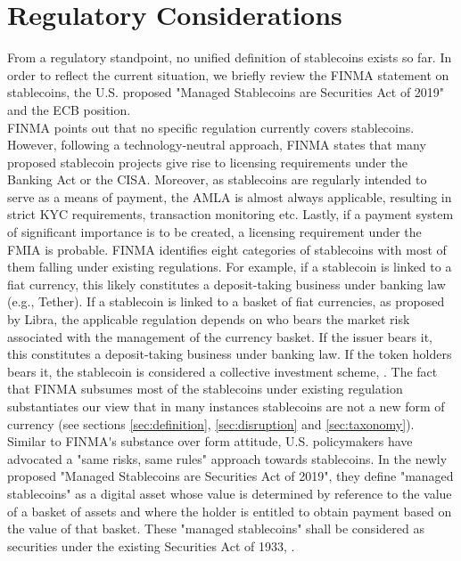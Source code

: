 \documentclass[conference]{IEEEtran}
\begin{document}
\section{Regulatory Considerations}
\label{sec:regulation}
From a regulatory standpoint, no unified definition of stablecoins exists so far. In order to reflect the current situation, we briefly review the \ac{FINMA} statement on stablecoins, the U.S. proposed "Managed Stablecoins are Securities Act of 2019" and the \ac{ECB} position.\\

\ac{FINMA} points out that no specific regulation currently covers stablecoins. However, following a technology-neutral approach, \ac{FINMA} states that many proposed stablecoin projects give rise to licensing requirements under the Banking Act or the \ac{CISA}. Moreover, as stablecoins are regularly intended to serve as a means of payment, the \ac{AMLA} is almost always applicable, resulting in strict \ac{KYC} requirements, transaction monitoring etc. Lastly, if a payment system of significant importance is to be created, a licensing requirement under the \ac{FMIA} is probable. \ac{FINMA} identifies eight categories of stablecoins with most of them falling under existing regulations. For example, if a stablecoin is linked to a fiat currency, this likely constitutes a deposit-taking business under banking law (e.g., Tether). If a stablecoin is linked to a basket of fiat currencies, as proposed by Libra, the applicable regulation depends on who bears the market risk associated with the management of the currency basket. If the issuer bears it, this  constitutes a deposit-taking business under banking law. If the token holders bears it, the stablecoin is considered a collective investment scheme, \cite{FINMA2}. The fact that \ac{FINMA} subsumes most of the stablecoins under existing regulation substantiates our view that in many instances stablecoins are not a new form of currency (see sections \ref{sec:definition}, \ref{sec:disruption} and \ref{sec:taxonomy}). Similar to \ac{FINMA's} substance over form attitude, U.S. policymakers have advocated a "same risks, same rules" approach towards stablecoins. In the newly proposed "Managed Stablecoins are Securities Act of 2019", they define "managed stablecoins" as a digital asset whose value is determined by reference to the value of a basket of assets and where the holder is entitled to obtain payment based on the value of that basket. These "managed stablecoins" shall be considered as securities under the existing Securities Act of 1933, \cite{Congress}.\\
\end{document}
